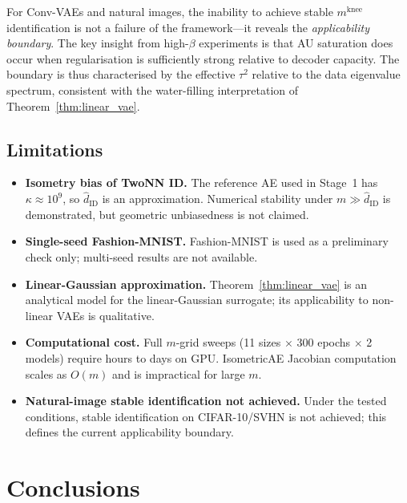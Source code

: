 \documentclass[11pt,a4paper]{article}
\newcommand{\kap}{\kappa}
\newcommand{\mknee}{m^{\mathrm{knee}}}
\newcommand{\hatdID}{\hat{d}_{\mathrm{ID}}}
\begin{document}
For Conv-VAEs and natural images, the inability to achieve stable $\mknee$
identification is not a failure of the framework---it reveals the
\emph{applicability boundary}.
The key insight from high-$\beta$ experiments is that AU saturation does occur
when regularisation is sufficiently strong relative to decoder capacity.
The boundary is thus characterised by the effective $\tau^2$ relative to the
data eigenvalue spectrum, consistent with the water-filling interpretation of
Theorem~\ref{thm:linear_vae}.

\subsection{Limitations}\label{sec:disc_limitation}

\begin{itemize}
\item \textbf{Isometry bias of TwoNN ID.}
The reference AE used in Stage~1 has $\kap\approx10^9$, so $\hatdID$ is an
approximation.
Numerical stability under $m\gg\hatdID$ is demonstrated, but geometric
unbiasedness is not claimed.

\item \textbf{Single-seed Fashion-MNIST.}
Fashion-MNIST is used as a preliminary check only; multi-seed results are not
available.

\item \textbf{Linear-Gaussian approximation.}
Theorem~\ref{thm:linear_vae} is an analytical model for the linear-Gaussian
surrogate; its applicability to non-linear VAEs is qualitative.

\item \textbf{Computational cost.}
Full $m$-grid sweeps (11 sizes $\times$ 300 epochs $\times$ 2 models) require
hours to days on GPU.
IsometricAE Jacobian computation scales as $O(m)$ and is impractical for large $m$.

\item \textbf{Natural-image stable identification not achieved.}
Under the tested conditions, stable identification on CIFAR-10/SVHN is not
achieved; this defines the current applicability boundary.
\end{itemize}

\section{Conclusions}\label{sec:conclusion}
\end{document}
